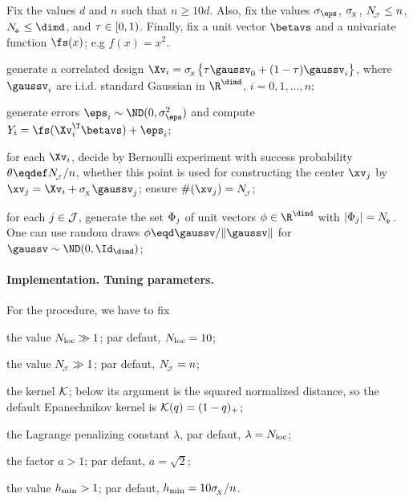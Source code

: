 Fix the values \( d \) and \( n \) such that \( n \geq 10 d \).
Also, fix the values \( \sigma_{\eps} \), \( \sigma_{\!_{X}} \), \( N_{\!_{\mathcal{J}}} \leq n \), \( \nSph \leq \dimd \), and \( \tau \in [0,1) \).
Finally, fix a unit vector \( \betavs \) and a univariate function \( \fs(x) \); e.g \( f(x) = x^{2} \).
\begin{mylist}

\item 
generate a correlated design \( \Xv_{i} = \sigmaX \bigl\{ \corr \gaussv_{0} + (1 - \corr) \gaussv_{i} \bigr\} \),
where \( \gaussv_{i} \) are i.i.d. standard Gaussian in \( \R^{\dimd} \), \( i=0,1,\ldots,n \);
\item 
generate errors \( \eps_{i} \sim \ND(0,\sigma_{\eps}^{2}) \) and compute \( Y_{i} = \fs(\Xv_{i}^{\T} \betavs) + \eps_{i} \);
\item 
for each \( \Xv_{i} \), decide by Bernoulli experiment with success probability \( \theta \eqdef \nJJJ/n \), whether this point is used for 
constructing the center \( \xv_{j} \) by \( \xv_{j} = \Xv_{i} + \sigmaX \gaussv_{j} \);
ensure \( \#(\xv_{j}) = \nJJJ \);
\item
for each \( j \in \mathcal{J} \), generate the set \( \Phi_{j} \) of unit vectors \( \sph \in \R^{\dimd} \)
with \( |\Phi_{j}| = N_{_{\! \Phi}} \).
One can use random draws \( \sph \eqd \gaussv/\| \gaussv \| \) for \( \gaussv \sim \ND(0,\Id_{\dimd}) \);

\end{mylist}

\paragraph{Implementation. Tuning parameters.}
For the procedure, we have to fix
\begin{mylist}

%
\item 
the value \( N_{\operatorname{loc}} \gg 1 \); par defaut, \( N_{\operatorname{loc}} = 10 \);

\item 
the value \( N_{\!_{\mathcal{J}}} \gg 1 \); par defaut, \( N_{\!_{\mathcal{J}}} = n \);

\item 
the kernel \( \mathcal{K} \); below its argument is the squared normalized distance, so the default Epanechnikov kernel is \( \mathcal{K}(q) = (1-q)_{+} \);

\item 
the Lagrange penalizing constant \( \lambda \), par defaut, \( \lambda = N_{\operatorname{loc}} \);

\item 
the factor \( a > 1 \); par defaut, \( a = \sqrt{2} \);

\item 
the value \( h_{\min} > 1 \); par defaut, \( h_{\min} = 10 \sigma_{\!_{X}}/n \).
\end{mylist}

